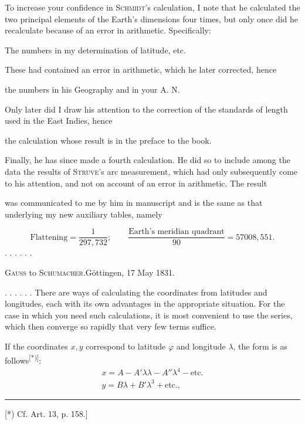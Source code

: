 To increase your confidence in \textsc{Schmidt}'s calculation, I note that he calculated the two principal elements of the Earth's dimensions four times, but only once did he recalculate because of an error in arithmetic. Specifically:
\begin{list}{}{\setlength{\leftmargin}{2em}\setlength{\itemsep}{0pt}\setlength{\parsep}{0pt}}
\item[1)] The numbers in my determination of latitude, etc.

These had contained an error in arithmetic, which he later corrected, hence
\item[2)] the numbers in his Geography and in your A. N.

Only later did I draw his attention to the correction of the standards of length used in the East Indies, hence
\item[3)] the calculation whose result is in the preface to the book.

Finally, he has since made a fourth calculation. He did so to include among the data the results of \textsc{Struve}'s arc measurement, which had only subsequently come to his attention, and not on account of an error in arithmetic. The result
\item[4)] was communicated to me by him in manuscript and is the same as that underlying my new auxiliary tables, namely
\end{list}
\[
\text{Flattening}=\frac1{297{,}732};\qquad
\frac{\text{Earth's meridian quadrant}}{90}=57008{,}551.
\]
. . . . . .
\bigskip
\begin{center}\textsc{Gauss} to \textsc{Schumacher}.\quad Göttingen, 17 May 1831.\end{center}
. . . . . . There are  ways of calculating the coordinates from latitudes and longitudes, each with its own advantages in the appropriate situation. For the case in which you need such calculations, it is most convenient to use the series, which then converge so rapidly that very few terms suffice.

If the coordinates \(x,y\) correspond to latitude \(\varphi\) and longitude \(\lambda\), the form is as follows\textsuperscript{[*)]}:
\[
\begin{array}{l}
x=A-A'\lambda\lambda-A''\lambda^4-\text{etc.}\\
y=B\lambda+B'\lambda^3+\text{etc.},
\end{array}
\]
\par\noindent\rule{4cm}{.4pt}\par
{\footnotesize\noindent\hspace*{\parindent}[*) Cf. Art. 13, p. 158.]\par}

